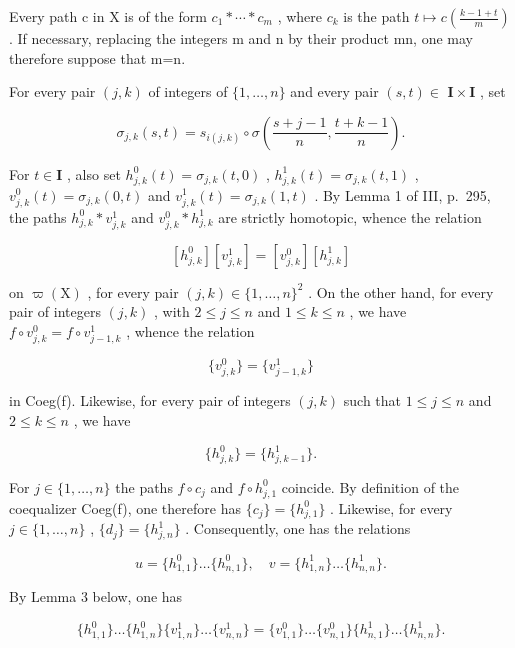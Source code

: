 Every path c in X is of the form \(c_{1}*\cdots*c_{m}\) , where \(c_{k}\) is the path \(t\mapsto c(\frac{k-1+t}{m})\) . If necessary, replacing the integers m and n by their product mn, one may therefore suppose that m=n.

For every pair \((j,k)\) of integers of \(\{1,\ldots ,n\}\) and every pair \((s,t)\in\) \(\mathbf{I}\times \mathbf{I}\) , set

\[
\sigma_ {j, k} (s, t) = s _ {i (j, k)} \circ \sigma \left(\frac {s + j - 1}{n}, \frac {t + k - 1}{n}\right).
\]

For \(t \in \mathbf{I}\) , also set \(h_{j,k}^{0}(t) = \sigma_{j,k}(t,0)\) , \(h_{j,k}^{1}(t) = \sigma_{j,k}(t,1)\) , \(v_{j,k}^{0}(t) = \sigma_{j,k}(0,t)\) and \(v_{j,k}^{1}(t) = \sigma_{j,k}(1,t)\) . By Lemma 1 of III, p.~295, the paths \(h_{j,k}^{0} * v_{j,k}^{1}\) and \(v_{j,k}^{0} * h_{j,k}^{1}\) are strictly homotopic, whence the relation

\[
[ h _ {j, k} ^ {0} ] [ v _ {j, k} ^ {1} ] = [ v _ {j, k} ^ {0} ] [ h _ {j, k} ^ {1} ]\tag{2}
\]

on \(\varpi(\mathrm{X})\) , for every pair \((j,k) \in \{1, \ldots, n\}^2\) . On the other hand, for every pair of integers \((j,k)\) , with \(2 \leqslant j \leqslant n\) and \(1 \leqslant k \leqslant n\) , we have \(f \circ v_{j,k}^0 = f \circ v_{j-1,k}^1\) , whence the relation

\[
\{v _ {j, k} ^ {0} \} = \{v _ {j - 1, k} ^ {1} \}\tag{3}
\]

in Coeg(f). Likewise, for every pair of integers \((j,k)\) such that \(1 \leqslant j \leqslant n\) and \(2 \leqslant k \leqslant n\) , we have

\[
\{h _ {j, k} ^ {0} \} = \{h _ {j, k - 1} ^ {1} \}.\tag{4}
\]

For \(j \in \{1, \ldots, n\}\) the paths \(f \circ c_j\) and \(f \circ h_{j,1}^0\) coincide. By definition of the coequalizer Coeg(f), one therefore has \(\{c_j\} = \{h_{j,1}^0\}\) . Likewise, for every \(j \in \{1, \ldots, n\}\) , \(\{d_j\} = \{h_{j,n}^1\}\) . Consequently, one has the relations

\[
u = \{h _ {1, 1} ^ {0} \} \dots \{h _ {n, 1} ^ {0} \}, \quad v = \{h _ {1, n} ^ {1} \} \dots \{h _ {n, n} ^ {1} \}.
\]

By Lemma 3 below, one has

\[
\{h _ {1, 1} ^ {0} \} \dots \{h _ {1, n} ^ {0} \} \{v _ {1, n} ^ {1} \} \dots \{v _ {n, n} ^ {1} \} = \{v _ {1, 1} ^ {0} \} \dots \{v _ {n, 1} ^ {0} \} \{h _ {n, 1} ^ {1} \} \dots \{h _ {n, n} ^ {1} \}.
\]

